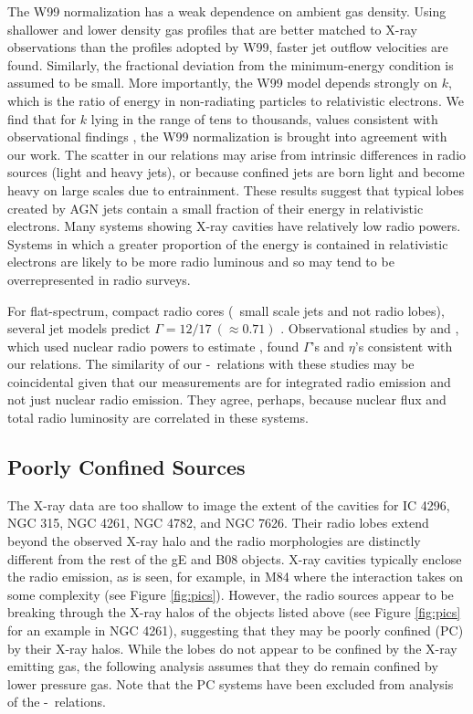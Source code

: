 \documentclass[12pt, preprint]{aastex}
\begin{document}
The W99 normalization has a weak dependence on ambient gas density.
Using shallower and lower density gas profiles that are better matched
to X-ray observations than the profiles adopted by W99, faster jet
outflow velocities are found. Similarly, the fractional deviation from
the minimum-energy condition is assumed to be small. More importantly,
the W99 model depends strongly on $k$, which is the ratio of energy in
non-radiating particles to relativistic electrons. We find that for
$k$ lying in the range of tens to thousands, values consistent with
observational findings \citep{2005MNRAS.364.1343D,
  2006MNRAS.372.1741D, 2006ApJ...648..200D, birzan08}, the W99
normalization is brought into agreement with our work. The scatter in
our relations may arise from intrinsic differences in radio sources
(light and heavy jets), or because confined jets are born light and
become heavy on large scales due to entrainment. These results suggest
that typical lobes created by AGN jets contain a small fraction of
their energy in relativistic electrons. Many systems showing X-ray
cavities have relatively low radio powers.  Systems in which a greater
proportion of the energy is contained in relativistic electrons are
likely to be more radio luminous and so may tend to be overrepresented
in radio surveys.

For flat-spectrum, compact radio cores (\ie\ small scale jets and not
radio lobes), several jet models predict $\Gamma = 12/17 ~(\approx
0.71)$ \citep{1979ApJ...232...34B, 1995A&A...293..665F,
  2003MNRAS.343L..59H}. Observational studies by
\citet{2005ApJ...633..384H} and \citet{2007MNRAS.381..589M}, which
used nuclear radio powers to estimate \pjet, found $\Gamma$'s and
$\eta$'s consistent with our relations. The similarity of our
\pjet-\prad\ relations with these studies may be coincidental given
that our measurements are for integrated radio emission and not just
nuclear radio emission. They agree, perhaps, because nuclear flux and
total radio luminosity are correlated in these systems.

\subsection{Poorly Confined Sources}
\label{sec:jet}

The X-ray data are too shallow to image the extent of the cavities for
IC 4296, NGC 315, NGC 4261, NGC 4782, and NGC 7626. Their radio lobes
extend beyond the observed X-ray halo and the radio morphologies are
distinctly different from the rest of the gE and B08 objects. X-ray
cavities typically enclose the radio emission, as is seen, for
example, in M84 \citep{2008ApJ...686..911F} where the interaction
takes on some complexity (see Figure \ref{fig:pics}). However, the
radio sources appear to be breaking through the X-ray halos of the
objects listed above (see Figure \ref{fig:pics} for an example in NGC
4261), suggesting that they may be poorly confined (PC) by their X-ray
halos. While the lobes do not appear to be confined by the X-ray
emitting gas, the following analysis assumes that they do remain
confined by lower pressure gas. Note that the PC systems have been
excluded from analysis of the \pjet-\prad\ relations.
\end{document}
